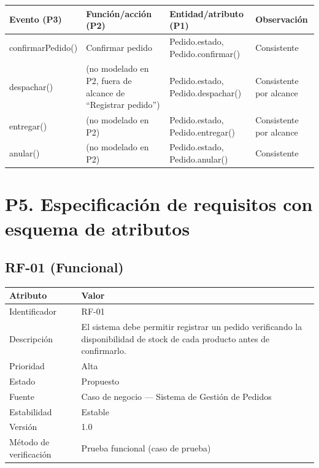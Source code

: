 \documentclass[11pt,letterpaper]{article}
\begin{document}
\begin{center}
\small
\begin{tabular}{p{2.2cm}p{3.8cm}p{4.8cm}p{2.8cm}}
\toprule
\textbf{Evento (P3)} & \textbf{Función/acción (P2)} & \textbf{Entidad/atributo (P1)} & \textbf{Observación} \\
\midrule
confirmarPedido() & Confirmar pedido & Pedido.estado, Pedido.confirmar() & Consistente \\
despachar() & (no modelado en P2, fuera de alcance de ``Registrar pedido'') & Pedido.estado, Pedido.despachar() & Consistente por alcance \\
entregar() & (no modelado en P2) & Pedido.estado, Pedido.entregar() & Consistente por alcance \\
anular() & (no modelado en P2) & Pedido.estado, Pedido.anular() & Consistente \\
\bottomrule
\end{tabular}
\end{center}
\section{P5. Especificación de requisitos con esquema de atributos}

\subsection*{RF-01 (Funcional)}
\begin{center}\small
\begin{tabular}{lp{10.5cm}}
\toprule
\textbf{Atributo} & \textbf{Valor} \\
\midrule
Identificador & RF-01 \\
Descripción & El sistema debe permitir registrar un pedido verificando la disponibilidad de stock de cada producto antes de confirmarlo. \\
Prioridad & Alta \\
Estado & Propuesto \\
Fuente & Caso de negocio --- Sistema de Gestión de Pedidos \\
Estabilidad & Estable \\
Versión & 1.0 \\
Método de verificación & Prueba funcional (caso de prueba) \\
\bottomrule
\end{tabular}
\end{center}
\end{document}
